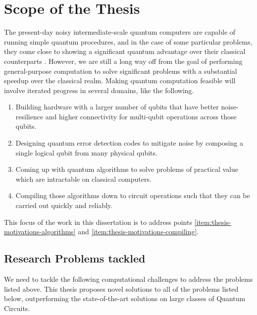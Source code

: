 \section{Scope of the Thesis}

The present-day noisy intermediate-scale quantum computers are capable of running simple quantum procedures, and in the case of some particular problems, they come close to showing a significant quantum advantage over their classical counterparts \cite{google-quantum-supremacy}. However, we are still a long way off from the goal of performing general-purpose computation to solve significant problems with a substantial speedup over the classical realm. Making quantum computation feasible will involve iterated progress in several domains, like the following. 
\begin{enumerate}
    \item Building hardware with a larger number of qubits that have better noise-resilience and higher connectivity for multi-qubit operations across those qubits. 
    \item Designing quantum error detection codes to mitigate noise by composing a single logical qubit from many physical qubits.
    \item \label{item:thesis-motivations-algorithms} Coming up with quantum algorithms to solve problems of practical value which are intractable on classical computers.
    \item \label{item:thesis-motivations-compiling} Compiling those algorithms down to circuit operations such that they can be carried out quickly and reliably.
\end{enumerate}

This focus of the work in this dissertation is to address points \ref{item:thesis-motivations-algorithms} and \ref{item:thesis-motivations-compiling}.

\subsection{Research Problems tackled}

We need to tackle the following computational challenges to address the problems listed above. This thesis proposes novel solutions to all of the problems listed below, outperforming the state-of-the-art solutions on large classes of Quantum Circuits.

